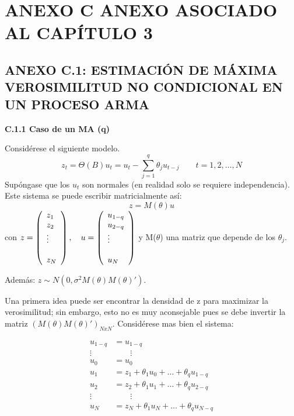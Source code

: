 \chapter*{ANEXO C ANEXO ASOCIADO AL CAP\'{I}TULO 3}
\section*{ANEXO C.1: ESTIMACI\'{O}N DE M\'{A}XIMA VEROSIMILITUD NO CONDICIONAL EN UN PROCESO ARMA}
\textbf{C.1.1 Caso de un MA (q)}

Consid\'{e}rese el siguiente modelo.
\[
z_{t} =\Theta (B)u_{t} =u_{t} -\sum_{j=1}^q \theta_{j} u_{t-j} \qquad t=1,2,\ldots,N
\]
Sup\'{o}ngase que los $u_{t}$ son normales (en realidad solo se requiere independencia). Este sistema se puede escribir matricialmente as\'{i}:
\[
z=M(\theta)u
\]
 con $z=\left( {{\begin{array}{*{20}c}
 {z_{1} } \hfill \\
 {z_{2} } \hfill \\
 \vdots \hfill \\
 \hfill \\
 {z_{N} } \hfill \\
\end{array} }} \right),\quad u=\left( {{\begin{array}{*{20}c}
 {u_{1-q} } \hfill \\
 {u_{2-q} } \hfill \\
 \vdots \hfill \\
 \hfill \\
 {u_{N} } \hfill \\
\end{array} }} \right)$ y M($\theta$) una matriz que depende de los $\theta_{j}$.\newline

Adem\'{a}s: $z \sim N(0,\sigma^{2}M(\theta)M(\theta)')$.\newline

Una primera idea puede ser encontrar la densidad de z para maximizar la verosimilitud; sin embargo, esto no es muy aconsejable pues se debe invertir la matriz $(M(\theta)M(\theta)')_{NxN}$. Consid\'{e}rese mas bien el sistema:

\begin{align*}
u_{1-q} &= u_{1-q}\\ 
\vdots & \qquad \vdots\\
u_{0} &= u_{0}\\
u_{1} &= z_{1}+\theta_{1}u_{0}+\ldots+\theta_{q}u_{1-q}\\
u_{2} &= z_{2}+\theta_{1}u_{1}+\ldots+\theta_{q}u_{2-q}\\
\vdots & \qquad \vdots\\
u_{N} &= z_{N}+\theta_{1}u_{N}+\ldots+\theta_{q}u_{N-q}\\
\end{align*}

